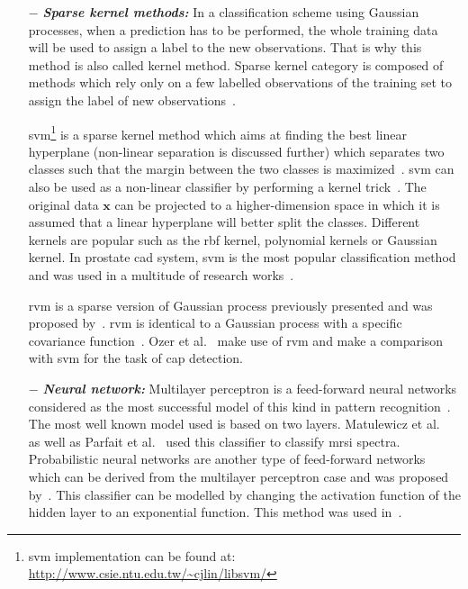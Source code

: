\begin{enumerate}[leftmargin=*]
\item[$-$] \textbf{\textit{Sparse kernel methods:}} In a classification scheme using Gaussian processes, when a prediction has to be performed, the whole training data will be used to assign a label to the new observations. That is why this method is also called kernel method. Sparse kernel category is composed of methods which rely only on a few labelled observations of the training set to assign the label of new observations~\cite{Bishop2006}.

  \Acf{svm}\footnote{\ac{svm} implementation can be found at: \url{http://www.csie.ntu.edu.tw/~cjlin/libsvm/}} is a sparse kernel method which aims at finding the best linear hyperplane (non-linear separation is discussed further) which separates two classes such that the margin between the two classes is maximized~\cite{Vapnik1963}. \ac{svm} can also be used as a non-linear classifier by performing a kernel trick~\cite{Boser1992}. The original data $\mathbf{x}$ can be projected to a higher-dimension space in which it is assumed that a linear hyperplane will better split the classes. Different kernels are popular such as the \ac{rbf} kernel, polynomial kernels or Gaussian kernel.
In prostate \ac{cad} system, \ac{svm} is the most popular classification method and was used in a multitude of research works~\cite{Artan2009,Artan2010,Chan2003,Kelm2007,Litjens2011,Litjens2012,Liu2013,Lopes2011,Niaf2011,Niaf2012,Ozer2009,Ozer2010,Parfait2012,Peng2013,Sung2011,Tiwari2012,Vos2008,Vos2008a,Vos2010,Vos2012}.

  \Acf{rvm} is a sparse version of Gaussian process previously presented and was proposed by~\cite{Tipping2001}. \ac{rvm} is identical to a Gaussian process with a specific covariance function~\cite{Quinonero-Candela2002}. Ozer et al.~\cite{Ozer2009,Ozer2010} make use of \ac{rvm} and make a comparison with \ac{svm} for the task of \ac{cap} detection.

\item[$-$] \textbf{\textit{Neural network:}} Multilayer perceptron is a feed-forward neural networks considered as the most successful model of this kind in pattern recognition~\cite{Bishop2006}. The most well known model used is based on two layers. Matulewicz et al.~\cite{Matulewicz2013} as well as Parfait et al.~\cite{Parfait2012} used this classifier to classify \ac{mrsi} spectra.
Probabilistic neural networks are another type of feed-forward networks which can be derived from the multilayer perceptron case and was proposed by~\cite{Specht1988}. This classifier can be modelled by changing the activation function of the hidden layer to an exponential function. This method was used  in~\cite{Ampeliotis2007,Ampeliotis2008,Viswanath2011}.


\end{enumerate}
